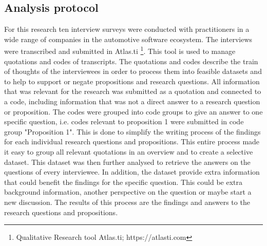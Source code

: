 \subsection{Analysis protocol}
For this research ten interview surveys were conducted with practitioners in a wide range of companies in the automotive software ecosystem. The interviews were transcribed and submitted in Atlas.ti \footnote{Qualitative Research tool Atlas.ti; https://atlasti.com}. This tool is used to manage quotations and codes of transcripts. The quotations and codes describe the train of thoughts of the interviewees in order to process them into feasible datasets and to help to support or negate propositions and research questions. All information that was relevant for the research was submitted as a quotation and connected to a code, including information that was not a direct answer to a research question or proposition. The codes were grouped into code groups to give an answer to one specific question, i.e. codes relevant to proposition 1 were submitted in code group "Proposition 1". This is done to simplify the writing process of the findings for each individual research questions and propositions. This entire process made it easy to group all relevant quotations in an overview and to create a selective dataset. This dataset was then further analysed to retrieve the answers on the questions of every interviewee. In addition, the dataset provide extra information that could benefit the findings for the specific question. This could be extra background information, another perspective on the question or maybe start a new discussion. The results of this process are the findings and answers to the research questions and propositions.